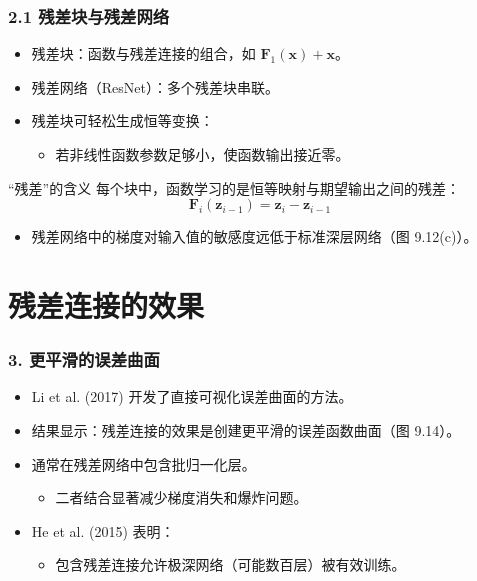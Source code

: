 \documentclass[t,aspectratio=169]{beamer} %
\begin{document}
\begin{frame}
    \frametitle{2.1 残差块与残差网络}
    \begin{itemize}
        \item \alert{残差块}：函数与残差连接的组合，如 $\mathbf{F}_1(\mathbf{x}) + \mathbf{x}$。
        \item \alert{残差网络}（ResNet）：多个残差块串联。
        \item 残差块可轻松生成\alert{恒等变换}：
        \begin{itemize}
            \item 若非线性函数参数足够小，使函数输出接近零。
        \end{itemize}
    \end{itemize}
    \begin{block}{“残差”的含义}
        每个块中，函数学习的是\alert{恒等映射与期望输出之间的残差}：
        \begin{equation}
            \mathbf{F}_i(\mathbf{z}_{i-1}) = \mathbf{z}_i - \mathbf{z}_{i-1}
            \tag{9.38}
        \end{equation}
    \end{block}
    \begin{itemize}
        \item 残差网络中的梯度对输入值的\alert{敏感度远低于}标准深层网络（图 9.12(c)）。
    \end{itemize}
\end{frame}

\section{残差连接的效果}

\begin{frame}
    \frametitle{3. 更平滑的误差曲面}
    \begin{itemize}
        \item Li et al. (2017) 开发了直接可视化误差曲面的方法。
        \item 结果显示：残差连接的效果是创建\alert{更平滑的误差函数曲面}（图 9.14）。
        \item 通常在残差网络中\alert{包含批归一化层}。
        \begin{itemize}
            \item 二者结合显著减少\alert{梯度消失和爆炸}问题。
        \end{itemize}
        \item He et al. (2015) 表明：
        \begin{itemize}
            \item 包含残差连接允许\alert{极深网络}（可能数百层）被有效训练。
        \end{itemize}
    \end{itemize}
\end{frame}
\end{document}
